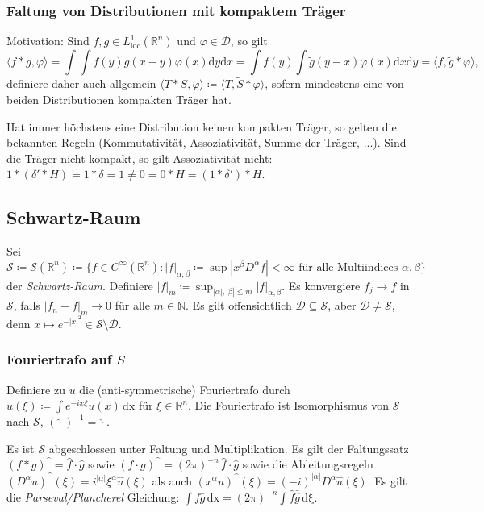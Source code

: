\documentclass[11pt,a4paper]{scrartcl}
\newcommand{\N}{\mathbb{N}} %
\newcommand{\R}{\mathbb{R}} %
\newcommand{\D}{\mathcal{D}}
\newcommand{\Sc}{\mathcal{S}}
\newcommand{\circum}{\text{\textasciicircum}}
\theoremstyle{plain}
\theoremstyle{definition}
\theoremstyle{remark}
\begin{document}
\subsubsection{Faltung von Distributionen mit kompaktem Träger}

Motivation: Sind $f,g\in L^1_\mathrm{loc}(\R^n)$ und $\varphi\in \D$, so gilt $$\langle f\ast g, \varphi \rangle = \int \int f(y) g(x-y) \varphi(x) \mathrm{d}y \mathrm{d}x = \int f(y) \int \tilde g(y-x) \varphi(x) \mathrm{d}x \mathrm{d}y = \langle f, \tilde g \ast \varphi \rangle,$$ definiere daher auch allgemein $\langle T\ast S, \varphi \rangle \coloneqq \langle T, \tilde S \ast \varphi \rangle$, sofern mindestens eine von beiden Distributionen kompakten Träger hat.

Hat immer höchstens eine Distribution keinen kompakten Träger, so gelten die bekannten Regeln (Kommutativität, Assoziativität, Summe der Träger, ...).  Sind die Träger nicht kompakt, so gilt Assoziativität nicht: $1*(\delta'*H)=1*\delta=1\neq 0=0*H=(1*\delta')*H$.

\subsection{Schwartz-Raum}

Sei $\Sc\coloneqq \Sc(\R^n)\coloneqq \{ f\in C^\infty(\R^n): |f|_{\alpha,\beta} \coloneqq \sup |x^\beta D^\alpha f| < \infty \text{ für alle Multiindices } \alpha, \beta \}$ der \emph{Schwartz-Raum}. Definiere $|f|_m \coloneqq \sup_{|\alpha|,|\beta| \leq m} |f|_{\alpha,\beta}$. Es konvergiere $f_j \to f$ in $\Sc$, falls $|f_n-f|_m \to 0$ für alle $m\in \N$. Es gilt offensichtlich $\D \subseteq \Sc$, aber $\D \neq \Sc$, denn $x\mapsto e^{-|x|^2} \in \Sc\setminus \D$.


\subsubsection{Fouriertrafo auf $S$}

Definiere zu $u$ die (anti-symmetrische) Fouriertrafo durch $\hat u(\xi)\coloneqq \int e^{-ix\xi}u(x) \, \mathrm{dx}$ für $\xi\in\R^n$. Die Fouriertrafo ist Isomorphismus von $\Sc$ nach $\Sc$, $(\hat \cdot )^{-1} = \check\cdot$.

Es ist $\Sc$ abgeschlossen unter Faltung und Multiplikation. Es gilt der Faltungssatz $(f*g)^{\mbox{\textasciicircum}} = \hat f \cdot \hat g$ sowie $(f\cdot g)^{\mbox{\textasciicircum}} = (2\pi)^{-n} \, \hat f \cdot \hat g$ sowie die Ableitungsregeln $(D^\alpha u)^\circum(\xi) = i^{|\alpha|} \xi^\alpha \hat u(\xi)$ als auch $(x^\alpha u)^\circum(\xi) = (-i)^{|\alpha|} D^\alpha \hat u(\xi)$. Es gilt die \emph{Parseval/Plancherel} Gleichung: $\int f\bar g \, \mathrm{dx} = (2\pi)^{-n} \int \hat f \bar{\hat g} \, \mathrm{d\xi}$.
\end{document}

